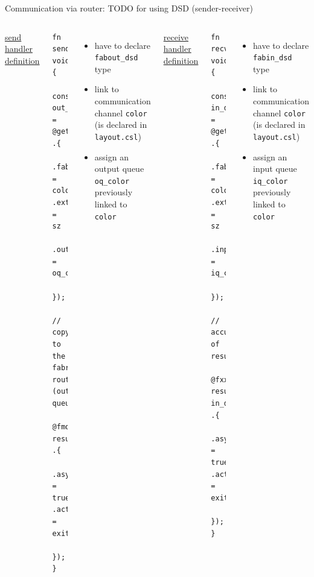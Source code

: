 \documentclass[dvipdfmx, 11pt, aspectratio=169]{beamer}   %
\begin{document}
\begin{frame}[fragile]{Communication via router: TODO for using DSD (sender-receiver)}
\begin{columns}
\uline{send handler definition}
\begin{lstlisting}[language=CSL, basicstyle=\ttfamily\tiny]
fn send() void {
    const out_dsd = @get_dsd(fabout_dsd, .{
        .fabric_color = color, .extent = sz
        .output_queue = oq_color
    });
    // copy to the fabric router (output queue)
    @fmovs(out_dsd, result_dsd, .{
        .async = true, .activate = exit_task_id 
    });
}
\end{lstlisting}
\begin{itemize}
    \item have to declare \lstinline|fabout_dsd| type
    \item link to communication channel \lstinline|color| (is declared in \lstinline|layout.csl|)
    \item assign an output queue \lstinline|oq_color| previously linked to \lstinline|color|
\end{itemize}
\uline{receive handler definition}
\begin{lstlisting}[language=CSL, basicstyle=\ttfamily\tiny]
fn recv() void {
    const in_dsd = @get_dsd(fabin_dsd, .{
        .fabric_color = color, .extent = sz
        .input_queue = iq_color
    });
    // accumulation of results
    @fxxx(result_dsd, result_dsd, in_dsd, .{
        .async = true, .activate = exit_task_id
    });
}
\end{lstlisting}
\begin{itemize}
    \item have to declare \lstinline|fabin_dsd| type
    \item link to communication channel \lstinline|color| (is declared in \lstinline|layout.csl|)
    \item assign an input queue \lstinline|iq_color| previously linked to \lstinline|color|
\end{itemize}
\end{columns}
\end{frame}
\end{document}
